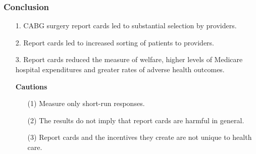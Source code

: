 \documentclass[10pt]{beamer}
\begin{document}
\begin{frame}\frametitle{Conclusion}
\setlength{\leftmargini}{12pt}

\begin{itemize}
    \item [1.] CABG surgery report cards led to substantial selection by providers.
    \item [2.] Report cards led to increased sorting of patients to providers.
    \item [3.] Report cards reduced the measure of welfare, higher levels of Medicare hospital expenditures and greater rates of adverse health outcomes.
\end{itemize}
    \begin{itemize}
        \item[] \textbf{Cautions}
    \begin{itemize}
        \item [(1)] Measure only short-run responses.
        \item [(2)] The results do not imply that report cards are harmful in general.
        \item [(3)] Report cards and the incentives they create are not unique to health care. 
    \end{itemize}
    \end{itemize}

\end{frame}
\end{document}

